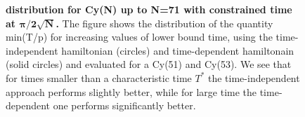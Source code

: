 

\begin{figure}[ht]
  \centering
  \caption[$\tau$ distribution for Cy(N) up to N=71 with constrained time at $\pi/2\sqrt(N)$.]{\textbf{\bm{$\tau$} distribution for Cy(N) up to N=71 with constrained time at $\bm{\pi/2\sqrt{N}}$.} The figure shows the distribution of the quantity min(T/p) for increasing values of lower bound time, using the time-independent hamiltonian (circles) and time-dependent hamiltonain (solid circles) and evaluated for a Cy(51) and Cy(53). We see that for times smaller than a characteristic time $T^*$ the time-independent approach performs slightly better, while for large time the time-dependent one performs significantly better. }
  \label{fig:delta_increasing_time}
\end{figure}
